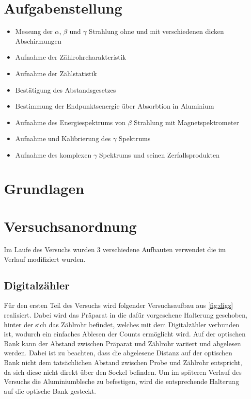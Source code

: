\documentclass[12pt,english,ngerman]{scrartcl}
\begin{document}
%
\tableofcontents
\newpage

\section{Aufgabenstellung\label{Auf}}



\begin{itemize}
    \item Messung der $\alpha$, $\beta$ und $\gamma$ Strahlung ohne und mit verschiedenen dicken Abschirmungen
    \item Aufnahme der Zählrohrcharakteristik
    \item Aufnahme der Zählstatistik
    \item Bestätigung des Abstandsgesetzes
    \item Bestimmung der Endpunktsenergie über Absorbtion in Aluminium
    \item Aufnahme des Energiespektrums von $\beta$ Strahlung mit Magnetspektrometer
    \item Aufnahme und Kalibrierung des $\gamma$ Spektrums
    \item Aufnahme des komplexen $\gamma$ Spektrums und seinen Zerfallsprodukten
\end{itemize}

\section{Grundlagen}\label{Grund}


\section{Versuchsanordnung}\label{sec:Versuchsanordnung}

Im Laufe des Versuchs wurden 3 verschiedene Aufbauten verwendet die im Verlauf modifiziert wurden.

\subsection{Digitalzähler}\label{aufbau_Digz}

Für den ersten Teil des Versuchs wird folgender Versuchsaufbau aus
\autoref{fig:digz} realisiert. Dabei wird das Präparat in die dafür vorgesehene
Halterung geschoben, hinter der sich das Zählrohr befindet, welches mit dem
Digitalzähler verbunden ist, wodurch ein einfaches Ablesen der Counts
ermöglicht wird. Auf der optischen Bank kann der Abstand zwischen Präparat und
Zählrohr variiert und abgelesen werden. Dabei ist zu beachten, dass die
abgelesene Distanz auf der optischen Bank nicht dem tatsächlichen Abstand
zwischen Probe und Zählrohr entspricht, da sich diese nicht direkt über den
Sockel befinden. Um im späteren Verlauf des Versuchs die Aluminiumbleche zu
befestigen, wird die entsprechende Halterung auf die optische Bank gesteckt.
\end{document}
